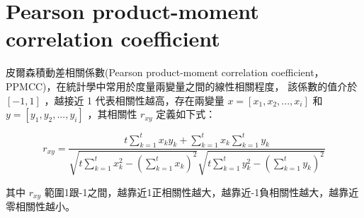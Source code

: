 \chapter{Pearson product-moment correlation coefficient}
\label{chapter:intro}
皮爾森積動差相關係數(Pearson product-moment correlation coefficient，PPMCC)，在統計學中常用於度量兩變量之間的線性相關程度， 該係數的值介於 \([−1,1]\) ，越接近 1 代表相關性越高，存在兩變量 \(x=[x_1,x_2,...,x_i]\) 和 \(y=[y_1,y_2,...,y_i]\)  ，其相關性 \(r_{xy}\) 定義如下式：


$$r_{xy}=\frac{t\sum^{t}_{k=1}x_ky_k+\sum_{k=1}^{t}x_k\sum_{k=1}^{t}y_k}{\sqrt{t \sum_{k=1}^{t}x_k^2-(\sum_{k=1}^{t}x_k)^2}\sqrt{t \sum_{k=1}^{t}y_k^2-(\sum_{k=1}^{t}y_k)^2}}$$


其中 \(r_{xy}\)  範圍1跟-1之間，越靠近1正相關性越大，越靠近-1負相關性越大，越靠近零相關性越小。
    
